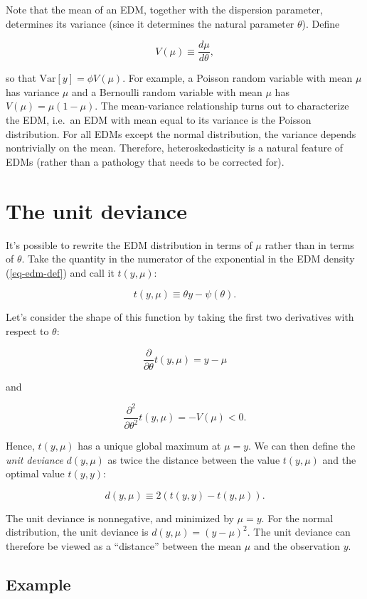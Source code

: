 \documentclass[
  11pt,
  letterpaper,
  oneside]{book}
\theoremstyle{plain}
\theoremstyle{plain}
\theoremstyle{definition}
\theoremstyle{definition}
\theoremstyle{plain}
\theoremstyle{remark}
\begin{document}
Note that the mean of an EDM, together with the dispersion parameter,
determines its variance (since it determines the natural parameter
\(\theta\)). Define

\[
V(\mu) \equiv \frac{d\mu}{d\theta},
\]

so that \(\text{Var}[y] = \phi V(\mu)\). For example, a Poisson random
variable with mean \(\mu\) has variance \(\mu\) and a Bernoulli random
variable with mean \(\mu\) has \(V(\mu) = \mu(1-\mu)\). The
mean-variance relationship turns out to characterize the EDM, i.e.~an
EDM with mean equal to its variance is the Poisson distribution. For all
EDMs except the normal distribution, the variance depends nontrivially
on the mean. Therefore, heteroskedasticity is a natural feature of EDMs
(rather than a pathology that needs to be corrected for).

\hypertarget{the-unit-deviance}{%
\section{The unit deviance}\label{the-unit-deviance}}

It's possible to rewrite the EDM distribution in terms of \(\mu\) rather
than in terms of \(\theta\). Take the quantity in the numerator of the
exponential in the EDM density (\ref{eq-edm-def}) and call it
\(t(y, \mu)\):

\[
t(y, \mu) \equiv \theta y - \psi(\theta).
\]

Let's consider the shape of this function by taking the first two
derivatives with respect to \(\theta\):

\[
\frac{\partial}{\partial \theta}t(y, \mu) = y - \mu
\]

and

\[
\frac{\partial^2}{\partial \theta^2}t(y, \mu) = -V(\mu) < 0.
\]

Hence, \(t(y, \mu)\) has a unique global maximum at \(\mu = y\). We can
then define the \emph{unit deviance} \(d(y, \mu)\) as twice the distance
between the value \(t(y, \mu)\) and the optimal value \(t(y,y)\):

\[
d(y, \mu) \equiv 2(t(y, y) - t(y, \mu)).
\]

The unit deviance is nonnegative, and minimized by \(\mu = y\). For the
normal distribution, the unit deviance is \(d(y, \mu) = (y - \mu)^2\).
The unit deviance can therefore be viewed as a ``distance'' between the
mean \(\mu\) and the observation \(y\).

\hypertarget{example}{%
\subsection{Example}\label{example}}
\end{document}
